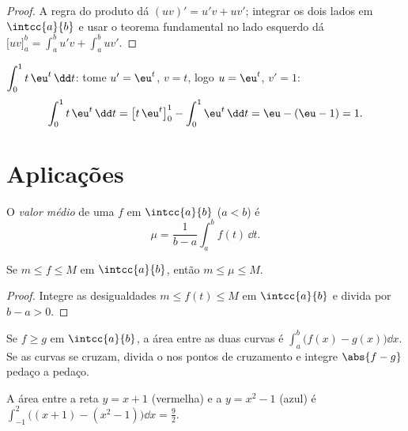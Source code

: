 \begin{proof}
A regra do produto dá $(uv)' = u'v + uv'$; integrar os dois lados em
$\intcc{a}{b}$ e usar o teorema fundamental no lado esquerdo dá
$\bigl[uv\bigr]_a^b = \int_a^b u'v + \int_a^b uv'$.
\end{proof}

\begin{example}\label{ex:g12:integ:ibp}
$\displaystyle\int_0^1 t\,\eu^{t}\,\dd t$: tome $u' = \eu^t$, $v = t$,
logo $u = \eu^t$, $v' = 1$:
\[
\int_0^1 t\,\eu^t\,\dd t = \bigl[t\,\eu^t\bigr]_0^1 - \int_0^1 \eu^t\,\dd t
= \eu - (\eu - 1) = 1 .
\]
\end{example}

\section{Aplicações}

\begin{definition}\label{def:g12:integ:mean}
O \emph{valor médio} de uma   $f$ em
$\intcc{a}{b}$ ($a<b$) é
\[
\mu = \frac{1}{b-a}\int_a^b f(t)\,\dd t .
\]
\end{definition}

\begin{proposition}\label{prop:g12:integ:meanbounds}
Se $m \leq f \leq M$ em $\intcc{a}{b}$, então $m \leq \mu \leq M$.
\end{proposition}

\begin{proof}
Integre as desigualdades $m \leq f(t) \leq M$ em $\intcc{a}{b}$ e divida
por $b - a > 0$.
\end{proof}

\begin{method}\label{met:g12:integ:areabetween}
Se $f \geq g$ em $\intcc{a}{b}$, a área entre as duas curvas é
$\int_a^b \bigl(f(x) - g(x)\bigr)\dd x$. Se as curvas se cruzam, divida o
 nos pontos de cruzamento e integre $\abs{f - g}$ pedaço a
pedaço.
\end{method}

\begin{omfigure}

{\small A área entre a reta $y = x + 1$ (vermelha) e a 
$y = x^2 - 1$ (azul) é $\int_{-1}^{2}
\bigl((x+1) - (x^2-1)\bigr)\dd x = \frac92$.}
\end{omfigure}

